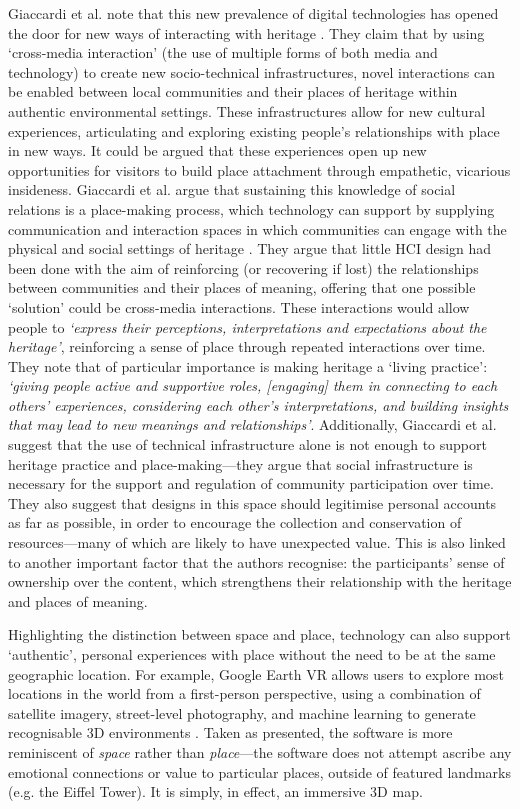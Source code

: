 Giaccardi et al. note that this new prevalence of digital technologies has opened the door for new ways of interacting with heritage \citep{Giaccardi2008}. They claim that by using `cross-media interaction' (the use of multiple forms of both media and technology) to create new socio-technical infrastructures, novel interactions can be enabled between local communities and their places of heritage within authentic environmental settings. These infrastructures allow for new cultural experiences, articulating and exploring existing people's relationships with place in new ways. It could be argued that these experiences open up new opportunities for visitors to build place attachment through empathetic, vicarious insideness. Giaccardi et al. argue that sustaining this knowledge of social relations is a place-making process, which technology can support by supplying communication and interaction spaces in which communities can engage with the physical and social settings of heritage \citep{Giaccardi2008}. They argue that little HCI design had been done with the aim of reinforcing (or recovering if lost) the relationships between communities and their places of meaning, offering that one possible `solution' could be cross-media interactions. These interactions would allow people to \textit{`express their perceptions, interpretations and expectations about the heritage'}, reinforcing a sense of place through repeated interactions over time. They note that of particular importance is making heritage a `living practice': \textit{`giving people active and supportive roles, [engaging] them in connecting to each others' experiences, considering each other's interpretations, and building insights that may lead to new meanings and relationships'}. Additionally, Giaccardi et al. suggest that the use of technical infrastructure alone is not enough to support heritage practice and place-making---they argue that social infrastructure is necessary for the support and regulation of community participation over time. They also suggest that designs in this space should legitimise personal accounts as far as possible, in order to encourage the collection and conservation of resources---many of which are likely to have unexpected value. This is also linked to another important factor that the authors recognise: the participants' sense of ownership over the content, which strengthens their relationship with the heritage and places of meaning.

Highlighting the distinction between space and place, technology can also support `authentic', personal experiences with place without the need to be at the same geographic location. For example, Google Earth VR allows users to explore most locations in the world from a first-person perspective, using a combination of satellite imagery, street-level photography, and machine learning to generate recognisable 3D environments \citep{Google}. Taken as presented, the software is more reminiscent of \textit{space} rather than \textit{place}---the software does not attempt ascribe any emotional connections or value to particular places, outside of featured landmarks (e.g. the Eiffel Tower). It is simply, in effect, an immersive 3D map. 

